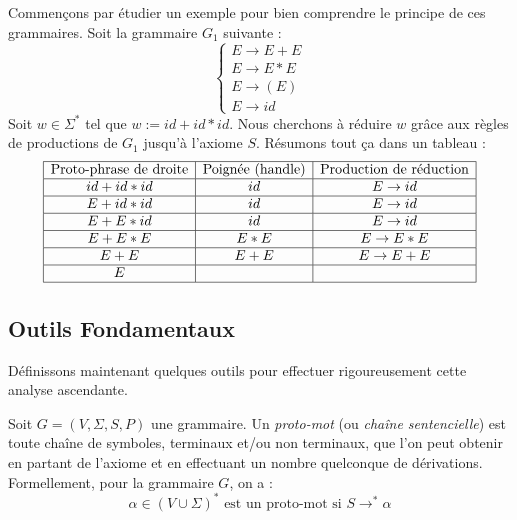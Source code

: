 \begin{example}
    Commençons par étudier un exemple pour bien comprendre le principe de ces grammaires. 
    Soit la grammaire $G_1$ suivante : 
        \[ 
            \begin{cases}
                E \to E + E \\ 
                E \to E * E \\ 
                E \to (E) \\ 
                E \to id 
            \end{cases}
        \] 
    Soit $ w \in \Sigma^*$ tel que $w := id + id * id$. Nous cherchons à réduire $w$ grâce aux règles de 
    productions de $G_1$ jusqu'à l'axiome $S$. Résumons tout ça dans un tableau : 
        \[ 
            \begin{array}{|c|c|c|}
                \hline 
                \text{Proto-phrase de droite} & \text{Poignée (handle)} & \text{Production de réduction} \\ 
                \hline 
                id + id * id & id & E \to id \\
                \hline  
                E + id * id & id & E \to id \\ 
                \hline
                E + E * id & id & E \to id \\ 
                \hline 
                E + E * E & E * E & E \to E * E \\ 
                \hline
                E + E & E + E & E \to E + E \\ 
                \hline 
                E & & \\
                \hline 
            \end{array}
        \] 
\end{example}

\subsection{Outils Fondamentaux}

Définissons maintenant quelques outils pour effectuer rigoureusement cette analyse ascendante. 

\begin{definition}
    Soit $G = (V, \Sigma, S, P)$ une grammaire. Un \emph{proto-mot} (ou \emph{chaîne sentencielle}) est 
    toute chaîne de symboles, terminaux et/ou non terminaux, que l'on peut obtenir en partant de 
    l'axiome et en effectuant un nombre quelconque de dérivations. 
    Formellement, pour la grammaire $G$, on a : 
        \[ \alpha \in (V \cup \Sigma)^* \text{ est un proto-mot si } S \to^* \alpha \] 
\end{definition}


